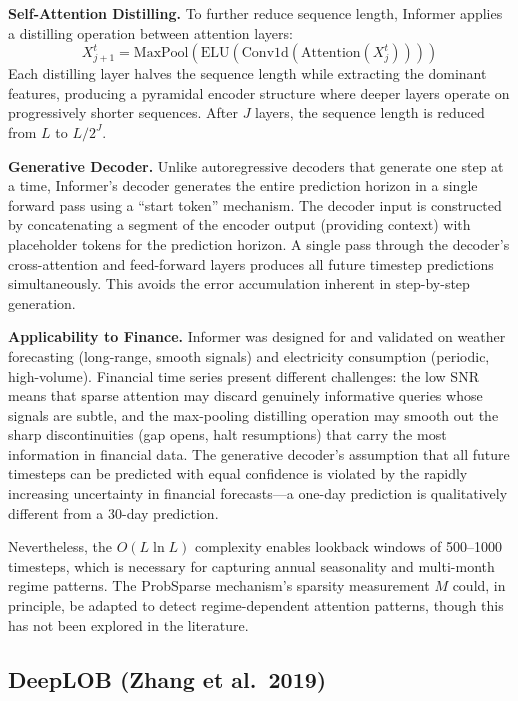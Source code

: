 \documentclass[conference]{IEEEtran}
\begin{document}
\textbf{Self-Attention Distilling.} To further reduce sequence length, Informer applies a distilling operation between attention layers:
\begin{equation}
X_{j+1}^t = \text{MaxPool}\!\left(\text{ELU}\!\left(\text{Conv1d}\!\left(\text{Attention}(X_j^t)\right)\right)\right)
\end{equation}
Each distilling layer halves the sequence length while extracting the dominant features, producing a pyramidal encoder structure where deeper layers operate on progressively shorter sequences. After $J$ layers, the sequence length is reduced from $L$ to $L / 2^J$.

\textbf{Generative Decoder.} Unlike autoregressive decoders that generate one step at a time, Informer's decoder generates the entire prediction horizon in a single forward pass using a ``start token'' mechanism. The decoder input is constructed by concatenating a segment of the encoder output (providing context) with placeholder tokens for the prediction horizon. A single pass through the decoder's cross-attention and feed-forward layers produces all future timestep predictions simultaneously. This avoids the error accumulation inherent in step-by-step generation.

\textbf{Applicability to Finance.} Informer was designed for and validated on weather forecasting (long-range, smooth signals) and electricity consumption (periodic, high-volume). Financial time series present different challenges: the low SNR means that sparse attention may discard genuinely informative queries whose signals are subtle, and the max-pooling distilling operation may smooth out the sharp discontinuities (gap opens, halt resumptions) that carry the most information in financial data. The generative decoder's assumption that all future timesteps can be predicted with equal confidence is violated by the rapidly increasing uncertainty in financial forecasts---a one-day prediction is qualitatively different from a 30-day prediction.

Nevertheless, the $O(L \ln L)$ complexity enables lookback windows of 500--1000 timesteps, which is necessary for capturing annual seasonality and multi-month regime patterns. The ProbSparse mechanism's sparsity measurement $M$ could, in principle, be adapted to detect regime-dependent attention patterns, though this has not been explored in the literature.

\subsection{DeepLOB (Zhang et al.\ 2019)}
\end{document}
